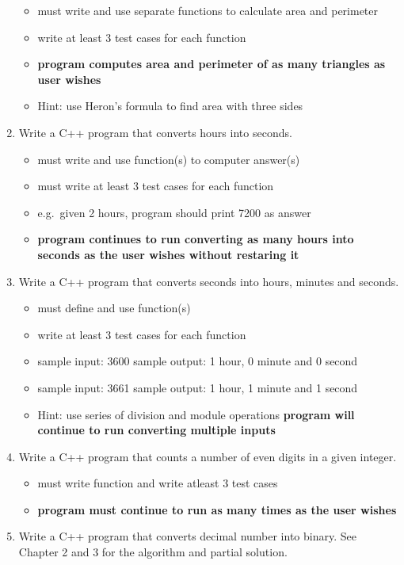 \documentclass[11pt]{article}
\providecommand{\tightlist}{%
      \setlength{\itemsep}{0pt}\setlength{\parskip}{0pt}}
\begin{document}
\begin{enumerate}
  \begin{itemize}
  \tightlist
  \item
    must write and use separate functions to calculate area and
    perimeter
  \item
    write at least 3 test cases for each function
  \item
    \textbf{program computes area and perimeter of as many triangles as
    user wishes}
  \item
    Hint: use Heron's formula to find area with three sides
  \end{itemize}
\item
  Write a C++ program that converts hours into seconds.

  \begin{itemize}
  \tightlist
  \item
    must write and use function(s) to computer answer(s)
  \item
    must write at least 3 test cases for each function
  \item
    e.g.~given 2 hours, program should print 7200 as answer
  \item
    \textbf{program continues to run converting as many hours into
    seconds as the user wishes without restaring it}
  \end{itemize}
\item
  Write a C++ program that converts seconds into hours, minutes and
  seconds.

  \begin{itemize}
  \tightlist
  \item
    must define and use function(s)
  \item
    write at least 3 test cases for each function
  \item
    sample input: 3600 sample output: 1 hour, 0 minute and 0 second
  \item
    sample input: 3661 sample output: 1 hour, 1 minute and 1 second
  \item
    Hint: use series of division and module operations \textbf{program
    will continue to run converting multiple inputs}
  \end{itemize}
\item
  Write a C++ program that counts a number of even digits in a given
  integer.

  \begin{itemize}
  \tightlist
  \item
    must write function and write atleast 3 test cases
  \item
    \textbf{program must continue to run as many times as the user
    wishes}
  \end{itemize}
\item
  Write a C++ program that converts decimal number into binary. See
  Chapter 2 and 3 for the algorithm and partial solution.


\end{enumerate}
\end{document}
